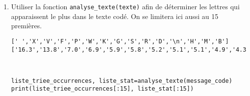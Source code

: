 \begin{enumerate}
\begin{enumerate}
\begin{verbatim}
[' ','E','S','A','I','L','R','T','N','U','O','\n','M','D','C']
['16.9','12.0','7.0','5.7','5.6','5.6','5.6','5.6','5.6','5.5','5.5','2.9',...]
\end{verbatim}

Remarque : pour afficher les flottants (\texttt{float}) de façon à obtenir l'exemple ci-dessus, il faut utiliser au moment du remplissage de la liste le code suivant :\\
\verb?liste_stat.append('%.01f'% valeur_calculee)?\\
où \verb?valeur_calculee? est la valeur du pourcentage qu'on veut ajouter à la liste.
\begin{solution}~\ \\
\begin{verbatim}
def analyse_texte(texte):
    compteur=[0 for i in range(len(clef_a))]
    for lettre in texte:
        i=clef_a.index(lettre)
        compteur[i]+=1
    print(compteur)

    liste_triee_occurrences=[]
    liste_stat=[]
    for i in range(len(clef_a)-2):
        m=0
        for i,total in enumerate(compteur):
            if total>m and clef_a[i] not in liste_triee_occurrences:
                m=total
                max=i
        liste_triee_occurrences.append(clef_a[max])
        liste_stat.append('%.01f'% (100*m/len(message_analyse)))
    return liste_triee_occurrences, liste_stat

liste_triee_occurrences, liste_stat=analyse_texte(message_analyse)
print(liste_triee_occurrences[:15], liste_stat[:15])
\end{verbatim}
\end{solution}

\item Utiliser la fonction \verb?analyse_texte(texte)? afin de déterminer les lettres qui apparaissent le plus dans le texte codé. On se limitera ici aussi au 15 premières.

\begin{verbatim}
[' ','X','V','F','P','W','K','G','S','R','D','\n','H','M','B']
['16.3','13.8','7.0','6.9','5.9','5.8','5.2','5.1','5.1','4.9','4.3','3.3',...]
\end{verbatim}
\begin{solution}~\ \\
\begin{verbatim}
liste_triee_occurrences, liste_stat=analyse_texte(message_code)
print(liste_triee_occurrences[:15], liste_stat[:15])
\end{verbatim}
\end{solution}
\end{enumerate}
\end{enumerate}


